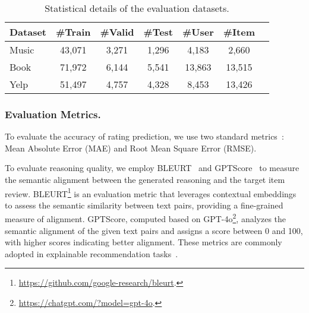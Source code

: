 \begin{table}[t]
\centering
\caption{ Statistical details of the evaluation datasets.}
\label{tab:dataset_stats}
\begin{tabular}{lcccccc}
\toprule
\textbf{Dataset} & \textbf{\#Train} & \textbf{\#Valid} & \textbf{\#Test} & \textbf{\#User} & \textbf{\#Item} \\ \midrule
Music            & 43,071           & 3,271            & 1,296           & 4,183           & 2,660           \\
Book             & 71,972           & 6,144            & 5,541           & 13,863          & 13,515          \\
Yelp             & 51,497           & 4,757            & 4,328           & 8,453           & 13,426          \\ \bottomrule
\end{tabular}
\end{table}


\subsubsection{\textbf{Evaluation Metrics.}} 
To evaluate the accuracy of rating prediction, we use two standard metrics~\cite{expert,chatgpt_CIKM}: Mean Absolute Error (MAE) and Root Mean Square Error (RMSE).



To evaluate reasoning quality, we employ BLEURT~\cite{Bleurt} and GPTScore~\cite{GPTScore} to measure the semantic alignment between the generated reasoning and the target item review. BLEURT\footnote{\url{https://github.com/google-research/bleurt}.} is an evaluation metric that leverages contextual embeddings to assess the semantic similarity between text pairs, providing a fine-grained measure of alignment. 
GPTScore, computed based on GPT-4o\footnote{\url{https://chatgpt.com/?model=gpt-4o}.}, analyzes the semantic alignment of the given text pairs and assigns a score between 0 and 100, with higher scores indicating better alignment. These metrics are commonly adopted in explainable recommendation tasks~\cite{XRec}.




